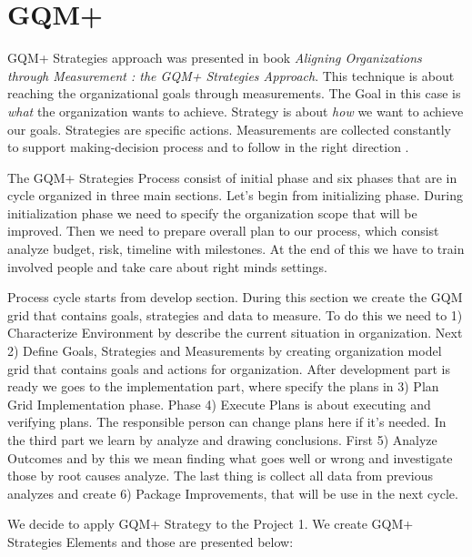 \section{GQM+}

GQM+ Strategies approach was presented in  book \textit{Aligning Organizations through Measurement : the GQM+ Strategies Approach}. This technique is about reaching the organizational goals through measurements. The Goal in this case is \textit{what} the organization wants to achieve. Strategy is about \textit{how} we want to achieve our goals. Strategies are specific actions. Measurements are collected constantly to support making-decision process and to follow in the right direction \cite{basili}.

The GQM+ Strategies  Process consist of initial phase and six phases that are in cycle organized in three main sections. Let's begin from initializing phase. During initialization phase we need to specify the organization scope that will be improved. Then we need to prepare overall plan to our process, which consist analyze budget, risk, timeline with milestones. At the end of this we have to train involved people and take care about right minds settings.

Process cycle starts from develop section. During this section we create the GQM grid that contains goals, strategies and data to measure. To do this we need to 1) Characterize Environment by describe the current situation in organization. Next 2) Define Goals, Strategies and Measurements by creating organization model grid that contains goals and actions for organization. After development part is ready we goes to the implementation part, where specify the plans in 3) Plan Grid Implementation phase. Phase 4) Execute Plans is about executing and verifying plans. The responsible person can change plans here if it's needed. In the third part we learn by analyze and drawing conclusions. First 5) Analyze Outcomes and by this we mean finding what goes well or wrong and investigate those by root causes analyze. The last thing is collect all data from previous  analyzes and create 6) Package Improvements, that will be use in the next cycle. \cite{basili}

We decide to apply GQM+ Strategy to the Project 1. We create GQM+ Strategies Elements and those are presented below:

